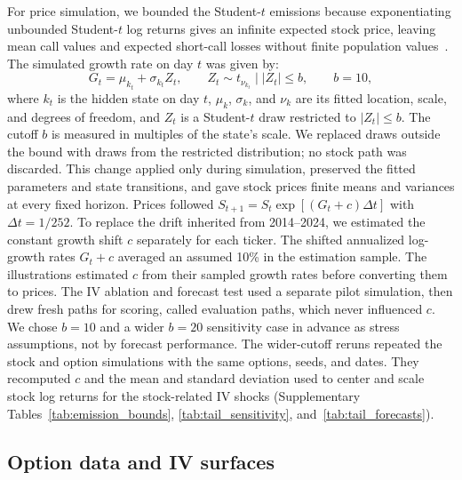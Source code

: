 For price simulation, we bounded the Student-$t$ emissions because exponentiating unbounded Student-$t$ log returns gives an infinite expected stock price, leaving mean call values and expected short-call losses without finite population values~\cite{cassidy2009}. The simulated growth rate on day $t$ was given by:
\begin{equation}\label{eq:truncated_emission}
 G_t=\mu_{k_t}+\sigma_{k_t} Z_t,\qquad
 Z_t\sim t_{\nu_{k_t}}\mid |Z_t|\le b,\qquad b=10,
\end{equation}
where $k_t$ is the hidden state on day $t$, $\mu_k$, $\sigma_k$, and $\nu_k$ are its fitted location, scale, and degrees of freedom, and $Z_t$ is a Student-$t$ draw restricted to $|Z_t|\le b$. The cutoff $b$ is measured in multiples of the state's scale. We replaced draws outside the bound with draws from the restricted distribution; no stock path was discarded. This change applied only during simulation, preserved the fitted parameters and state transitions, and gave stock prices finite means and variances at every fixed horizon. Prices followed $S_{t+1}=S_t\exp[(G_t+c)\Delta t]$ with $\Delta t=1/252$. To replace the drift inherited from 2014--2024, we estimated the constant growth shift $c$ separately for each ticker. The shifted annualized log-growth rates $G_t+c$ averaged an assumed 10\% in the estimation sample. The illustrations estimated $c$ from their sampled growth rates before converting them to prices. The IV ablation and forecast test used a separate pilot simulation, then drew fresh paths for scoring, called evaluation paths, which never influenced $c$. We chose $b=10$ and a wider $b=20$ sensitivity case in advance as stress assumptions, not by forecast performance. The wider-cutoff reruns repeated the stock and option simulations with the same options, seeds, and dates. They recomputed $c$ and the mean and standard deviation used to center and scale stock log returns for the stock-related IV shocks (Supplementary Tables~\ref{tab:emission_bounds}, \ref{tab:tail_sensitivity}, and~\ref{tab:tail_forecasts}).

\subsection{Option data and IV surfaces}

